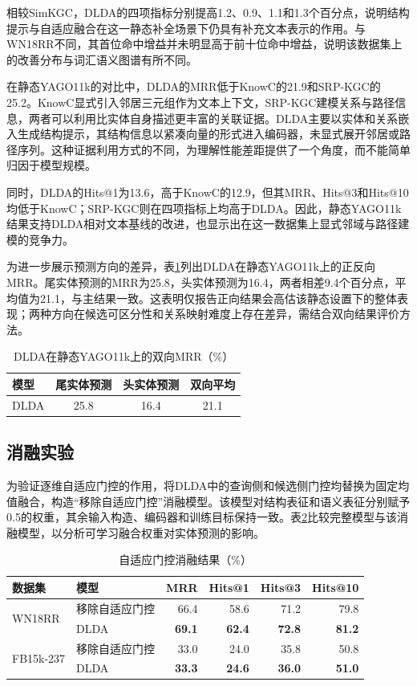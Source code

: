 相较SimKGC，DLDA的四项指标分别提高1.2、0.9、1.1和1.3个百分点，说明结构提示与自适应融合在这一静态补全场景下仍具有补充文本表示的作用。与WN18RR不同，其首位命中增益并未明显高于前十位命中增益，说明该数据集上的改善分布与词汇语义图谱有所不同。

在静态YAGO11k的对比中，DLDA的MRR低于KnowC的21.9和SRP-KGC的25.2。KnowC显式引入邻居三元组作为文本上下文，SRP-KGC建模关系与路径信息，两者可以利用比实体自身描述更丰富的关联证据。DLDA主要以实体和关系嵌入生成结构提示，其结构信息以紧凑向量的形式进入编码器，未显式展开邻居或路径序列。这种证据利用方式的不同，为理解性能差距提供了一个角度，而不能简单归因于模型规模。

同时，DLDA的Hits@1为13.6，高于KnowC的12.9，但其MRR、Hits@3和Hits@10均低于KnowC；SRP-KGC则在四项指标上均高于DLDA。因此，静态YAGO11k结果支持DLDA相对文本基线的改进，也显示出在这一数据集上显式邻域与路径建模的竞争力。

为进一步展示预测方向的差异，表\ref{tab:c4_yago_direction}列出DLDA在静态YAGO11k上的正反向MRR。尾实体预测的MRR为25.8，头实体预测为16.4，两者相差9.4个百分点，平均值为21.1，与主结果一致。这表明仅报告正向结果会高估该静态设置下的整体表现；两种方向在候选可区分性和关系映射难度上存在差异，需结合双向结果评价方法。

\begin{table}[!htbp]
\centering
{}
\caption{DLDA在静态YAGO11k上的双向MRR（\%）}
\label{tab:c4_yago_direction}
\begin{tabular}{lccc}
\toprule
模型 & 尾实体预测 & 头实体预测 & 双向平均\\
\midrule
DLDA & 25.8 & 16.4 & 21.1\\
\bottomrule
\end{tabular}
\end{table}

\subsection{消融实验}

为验证逐维自适应门控的作用，将DLDA中的查询侧和候选侧门控均替换为固定均值融合，构造“移除自适应门控”消融模型。该模型对结构表征和语义表征分别赋予0.5的权重，其余输入构造、编码器和训练目标保持一致。表\ref{tab:c4_ablation}比较完整模型与该消融模型，以分析可学习融合权重对实体预测的影响。

\begin{table}[!htbp]
\centering
{}
\caption{自适应门控消融结果（\%）}
\small
\label{tab:c4_ablation}
\begin{tabular}{llrrrr}
\toprule
数据集 & 模型 & MRR & Hits@1 & Hits@3 & Hits@10\\
\midrule
\multirow{2}{*}{WN18RR} & 移除自适应门控 & 66.4 & 58.6 & 71.2 & 79.8\\
 & DLDA & \textbf{69.1} & \textbf{62.4} & \textbf{72.8} & \textbf{81.2}\\
\midrule
\multirow{2}{*}{FB15k-237} & 移除自适应门控 & 33.0 & 24.0 & 35.8 & 50.8\\
 & DLDA & \textbf{33.3} & \textbf{24.6} & \textbf{36.0} & \textbf{51.0}\\
\bottomrule
\end{tabular}
\end{table}

